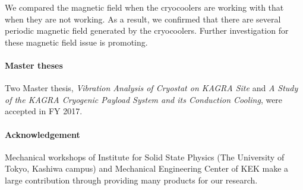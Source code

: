 We compared the magnetic field when the cryocoolers are working with that when they are not working. As a result, we confirmed that there are several periodic magnetic field generated by the cryocoolers. Further investigation for these magnetic field issue is promoting.

\paragraph*{\bi Master theses}

Two Master thesis, {\it Vibration Analysis of Cryostat on KAGRA Site} and {\it A Study of the KAGRA Cryogenic Payload System and its Conduction Cooling}, were accepted in FY 2017. 

\paragraph*{\bi Acknowledgement}

Mechanical workshops of Institute for Solid State Physics (The University of Tokyo, Kashiwa campus) and Mechanical Engineering Center of KEK make a large contribution through providing many products for our research.
